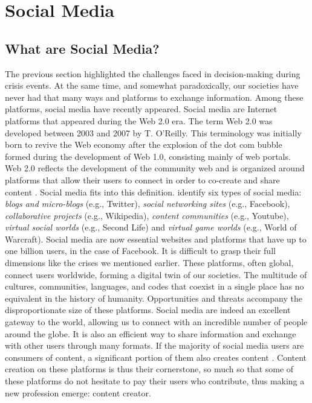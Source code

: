 \section{Social Media}
\subsection{What are Social Media?}
The previous section highlighted the challenges faced in decision-making during crisis events.
At the same time, and somewhat paradoxically, our societies have never had that many ways and platforms to exchange information.
Among these platforms, social media have recently appeared.
Social media are Internet platforms that appeared during the Web 2.0 era.
The term Web 2.0 was developed between 2003 and 2007 by T. O'Reilly.
This terminology was initially born to revive the Web economy after the explosion of the dot com bubble formed during the development of Web 1.0, consisting mainly of web portals.
Web 2.0 reflects the development of the community web and is organized around platforms that allow their users to connect in order to co-create and share content \textcite{oreillyWhatWebDesign2007b}.
Social media fits into this definition.
\textcite{kaplanUsersWorldUnite2010} identify six types of social media: \emph{blogs and micro-blogs} (e.g., Twitter), \emph{social networking sites} (e.g., Facebook), \emph{collaborative projects} (e.g., Wikipedia), \emph{content communities} (e.g., Youtube), \emph{virtual social worlds} (e.g., Second Life) and \emph{virtual game worlds} (e.g., World of Warcraft).
Social media are now essential websites and platforms that have up to one billion users, in the case of Facebook.
It is difficult to grasp their full dimensions like the crises we mentioned earlier.
These platforms, often global, connect users worldwide, forming a digital twin of our societies.
The multitude of cultures, communities, languages, and codes that coexist in a single place has no equivalent in the history of humanity.
Opportunities and threats accompany the disproportionate size of these platforms.
Social media are indeed an excellent gateway to the world, allowing us to connect with an incredible number of people around the globe.
It is also an efficient way to share information and exchange with other users through many formats.
If the majority of social media users are consumers of content, a significant portion of them also creates content \parencite{fuchsSocialMediaCritical2021}.
Content creation on these platforms is thus their cornerstone, so much so that some of these platforms do not hesitate to pay their users who contribute, thus making a new profession emerge: content creator.

